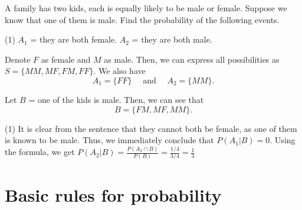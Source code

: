  
\begin{frame}[t] 
\begin{ex} 
A family has two kids, each is equally likely to be male or female. Suppose we know that one of them is male. Find the probability of the following events.
\begin{tasks}(1)
\task $A_1$ = they are both female.
\task $A_2$ = they are both male.
\end{tasks}
\end{ex} 
\end{frame}


\begin{frame}[t] 
\begin{sol}
Denote $F$ as female and $M$ as male. Then, we can express all possibilities as $S = \{MM, MF, FM, FF\}$. We also have  
\[A_1 = \{FF\} \quad \text{ and } \quad A_2 = \{MM\}.\]

\medskip
Let $B$ = one of the kids is male. Then, we can see that 
\[B = \{FM, MF, MM\}.\]
\begin{tasks}(1)
\task It is clear from the sentence that they cannot both be female, as one of them is known to be male. Thus, we immediately conclude that $P(A_1|B) = 0$.
\task Using the formula, we get $P(A_2 |B) = \frac{P(A_2 \cap B)}{P(B)} = \frac{1/4}{3/4} = \frac{1}{3}$
\end{tasks}
\end{sol}
\end{frame}

\section[Basic rules]{Basic rules for probability}
\frame{\sectionpage}

